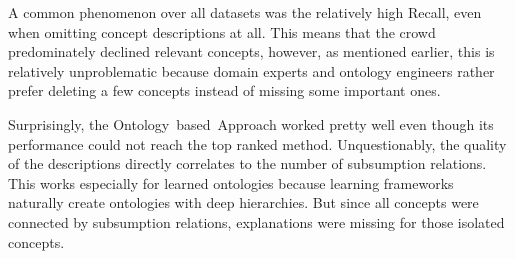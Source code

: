 A common phenomenon over all datasets was the relatively high Recall, even when omitting concept descriptions at all. This means that the crowd predominately declined relevant concepts, however, as mentioned earlier, this is relatively unproblematic because domain experts and ontology engineers rather prefer deleting a few concepts instead of missing some important ones. 

Surprisingly, the Ontology~based~Approach worked pretty well even though its performance could not reach the top ranked method. Unquestionably,
the quality of the descriptions directly correlates to the number of subsumption relations. This works especially for learned ontologies because learning frameworks naturally create ontologies with deep hierarchies. But since all concepts were connected by subsumption relations, explanations were missing for those isolated concepts. 


